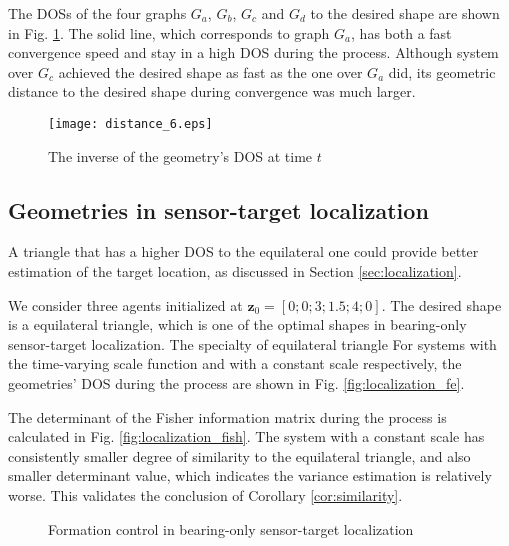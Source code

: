 \documentclass[times]{rncauth}
\begin{document}
The DOSs of the four graphs $G_a$, $G_b$, $G_c$ and
$G_d$ to the desired shape  are shown in Fig. \ref{fig:for_bias_six}. The solid line,
which corresponds to graph $G_a$, has both a fast convergence speed
and stay in a high DOS during the process. Although system over
$G_c$ achieved the desired shape as fast as the one over $G_a$ did,
its geometric distance to the desired shape during convergence was much larger.
\begin{figure}
\begin{center}
\texttt{[image: distance\_6.eps]}
\caption{The inverse of the geometry's DOS  at time $t$}
\label{fig:for_bias_six}
\end{center}
\end{figure}

\subsection{Geometries in sensor-target localization}
A triangle that has a higher DOS to the equilateral
one could provide better estimation of the target location, as
discussed in Section \ref{sec:localization}.

We consider three agents initialized at
$\mathbf{z}_0=[0;0;3;1.5;4;0]$. The desired shape is a equilateral
triangle, which is one of the optimal shapes in bearing-only
sensor-target localization. The specialty of equilateral triangle  For systems with the time-varying scale
function and with a constant scale respectively, the geometries'
DOS during the process are shown in Fig.
\ref{fig:localization_fe}.

The determinant of the Fisher information matrix during the process
is calculated in Fig. \ref{fig:localization_fish}. The system with a
constant scale has consistently smaller degree of
similarity to the equilateral triangle, and also smaller determinant
value, which indicates the variance estimation is relatively worse.
This validates the conclusion of Corollary \ref{cor:similarity}.
\begin{figure}
\caption{Formation control in bearing-only sensor-target
localization}
\end{figure}
\end{document}
